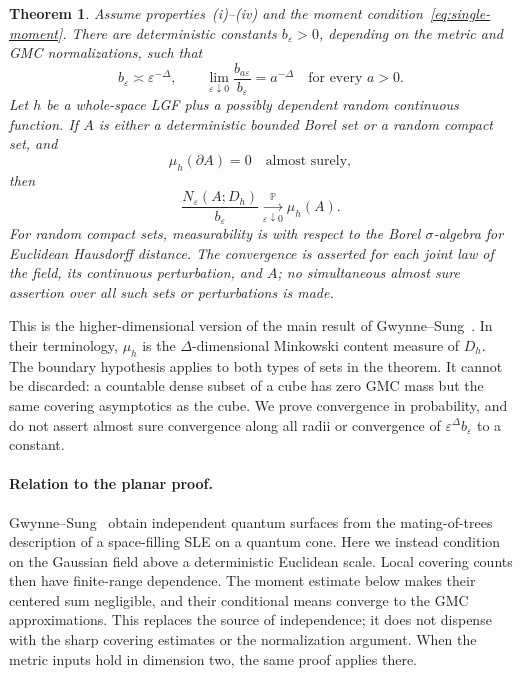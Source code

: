 \documentclass[11pt,letterpaper]{article}
\renewcommand{\P}{\mathbb P}
\newcommand{\eps}{\varepsilon}
\newtheorem{theorem}{Theorem}[section]
\theoremstyle{definition}
\theoremstyle{remark}
\numberwithin{equation}{section}
\begin{document}
\begin{theorem}\label{thm:main}
Assume properties~\textup{(i)--(iv)} and the moment condition~\eqref{eq:single-moment}. There are deterministic constants $b_\eps>0$, depending on the metric and GMC normalizations, such that
\begin{equation}\label{eq:b-properties}
 b_\eps\asymp\eps^{-\Delta},\qquad
 \lim_{\eps\downarrow0}\frac{b_{a\eps}}{b_\eps}=a^{-\Delta}
 \quad\text{for every }a>0.
\end{equation}
Let $h$ be a whole-space LGF plus a possibly dependent random continuous function. If $A$ is either a deterministic bounded Borel set or a random compact set, and
\begin{equation}\label{eq:continuity-set}
 \mu_h(\partial A)=0\quad\text{almost surely},
\end{equation}
then
\begin{equation}\label{eq:main-limit}
 \frac{N_\eps(A;D_h)}{b_\eps}
 \xrightarrow[\eps\downarrow0]{\P}\mu_h(A).
\end{equation}
For random compact sets, measurability is with respect to the Borel $\sigma$-algebra for Euclidean Hausdorff distance. The convergence is asserted for each joint law of the field, its continuous perturbation, and $A$; no simultaneous almost sure assertion over all such sets or perturbations is made.
\end{theorem}

This is the higher-dimensional version of the main result of Gwynne--Sung~\cite{GS}. In their terminology, $\mu_h$ is the $\Delta$-dimensional Minkowski content measure of $D_h$. The boundary hypothesis applies to both types of sets in the theorem. It cannot be discarded: a countable dense subset of a cube has zero GMC mass but the same covering asymptotics as the cube. We prove convergence in probability, and do not assert almost sure convergence along all radii or convergence of $\eps^\Delta b_\eps$ to a constant.

\paragraph{Relation to the planar proof.}
Gwynne--Sung~\cite{GS} obtain independent quantum surfaces from the mating-of-trees description of a space-filling SLE on a quantum cone. Here we instead condition on the Gaussian field above a deterministic Euclidean scale. Local covering counts then have finite-range dependence. The moment estimate below makes their centered sum negligible, and their conditional means converge to the GMC approximations. This replaces the source of independence; it does not dispense with the sharp covering estimates or the normalization argument. When the metric inputs hold in dimension two, the same proof applies there.
\end{document}
